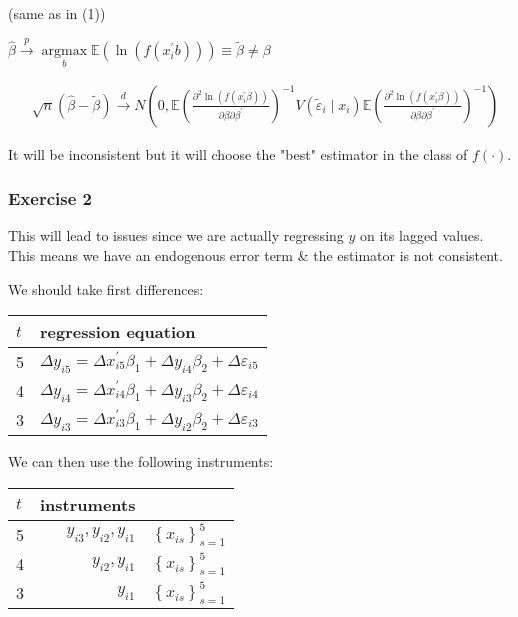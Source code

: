 {{\begin{enumerate}[label=(\arabic*)]
{(same as in (1))
}
{\item 
$\hat{\beta} \xrightarrow{p} \underset{b}{\operatorname{argmax}} \mathbb{E}\left(\ln \left(f\left(x_{i}^\prime b\right)\right)\right) \equiv \tilde{\beta} \neq \beta$

$$
\begin{aligned}
& \sqrt{n}(\hat{\beta}-\tilde{\beta}) \xrightarrow{d} N\left(0, \mathbb{E}\left(\frac{\partial^{2} \ln \left(f\left(x_{i}^\prime \beta\right)\right)}{\partial \beta \partial \beta^{\prime}}\right)^{-1} V\left(\tilde{\varepsilon}_{i} \mid x_{i}\right) \mathbb{E}\left(\frac{\partial^{2} \ln \left(f\left(x_{i}^\prime \beta\right)\right)}{\partial \beta \partial \beta^{\prime}}\right)^{-1}\right)
\end{aligned}
$$

It will be inconsistent but it will choose the "best" estimator in the class of $f(\cdot)$.
}
\end{enumerate}
}
{
\subsubsection*{Exercise 2}

\begin{enumerate}[label=(\arabic*)]
{\item 
This will lead to issues since we are actually regressing $y$ on its lagged values. This means we have an endogenous error term \& the estimator is not consistent.
}
{\item 
We should take first differences:

\begin{center}
\begin{tabular}{l|l}
$t$ & regression equation \\
\hline 5 & $\Delta y_{i 5}=\Delta x_{i 5}^{\prime} \beta_{1}+\Delta y_{i 4} \beta_{2}+\Delta \varepsilon_{i 5}$ \\
4 & $\Delta y_{i 4}=\Delta x_{i 4}^{\prime} \beta_{1}+\Delta y_{i 3} \beta_{2}+\Delta \varepsilon_{i 4}$ \\
3 & $\Delta y_{i 3}=\Delta x_{i 3}^{\prime} \beta_{1}+\Delta y_{i 2} \beta_{2}+\Delta \varepsilon_{i 3}$
\end{tabular}
\end{center}

We can then use the following instruments:

\begin{center}
\begin{tabular}{l|r r}
$t$ & instruments & \\\hline
5 & $y_{i 3}, y_{i 2}, y_{i 1}$ & $\left\{x_{i s}\right\}_{s=1}^5$ \\
4 & $y_{i 2}, y_{i 1}$ & $\left\{x_{i s}\right\}_{s=1}^5$ \\
3 & $y_{i 1}$ & $\left\{x_{i s}\right\}_{s=1}^5$
\end{tabular}
\end{center}

}
\end{enumerate}}}
